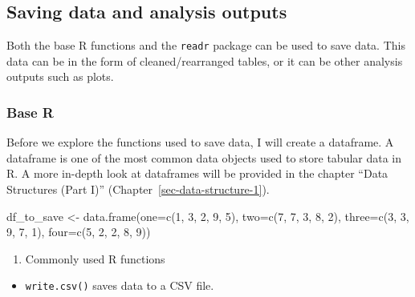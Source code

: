 \documentclass[
  letterpaper,
  DIV=11,
  numbers=noendperiod]{scrreprt}
\newenvironment{Shaded}{}{}
\newcommand{\AttributeTok}[1]{\textcolor[rgb]{0.84,0.23,0.29}{#1}}
\newcommand{\DecValTok}[1]{\textcolor[rgb]{0.00,0.36,0.77}{#1}}
\newcommand{\FunctionTok}[1]{\textcolor[rgb]{0.44,0.26,0.76}{#1}}
\newcommand{\NormalTok}[1]{\textcolor[rgb]{0.14,0.16,0.18}{#1}}
\newcommand{\OtherTok}[1]{\textcolor[rgb]{0.44,0.26,0.76}{#1}}
\providecommand{\tightlist}{%
  \setlength{\itemsep}{0pt}\setlength{\parskip}{0pt}}\usepackage{longtable,booktabs,array}
\begin{document}
\subsection{Saving data and analysis
outputs}\label{saving-data-and-analysis-outputs}

Both the base R functions and the \texttt{readr} package can be used to
save data. This data can be in the form of cleaned/rearranged tables, or
it can be other analysis outputs such as plots.

\subsubsection{Base R}\label{base-r-1}

Before we explore the functions used to save data, I will create a
dataframe. A dataframe is one of the most common data objects used to
store tabular data in R. A more in-depth look at dataframes will be
provided in the chapter ``Data Structures (Part I)''
(Chapter~\ref{sec-data-structure-1}).

\begin{Shaded}
\begin{Highlighting}[]
\NormalTok{df\_to\_save }\OtherTok{\textless{}{-}} \FunctionTok{data.frame}\NormalTok{(}\AttributeTok{one=}\FunctionTok{c}\NormalTok{(}\DecValTok{1}\NormalTok{, }\DecValTok{3}\NormalTok{, }\DecValTok{2}\NormalTok{, }\DecValTok{9}\NormalTok{, }\DecValTok{5}\NormalTok{),}
                         \AttributeTok{two=}\FunctionTok{c}\NormalTok{(}\DecValTok{7}\NormalTok{, }\DecValTok{7}\NormalTok{, }\DecValTok{3}\NormalTok{, }\DecValTok{8}\NormalTok{, }\DecValTok{2}\NormalTok{),}
                         \AttributeTok{three=}\FunctionTok{c}\NormalTok{(}\DecValTok{3}\NormalTok{, }\DecValTok{3}\NormalTok{, }\DecValTok{9}\NormalTok{, }\DecValTok{7}\NormalTok{, }\DecValTok{1}\NormalTok{),}
                         \AttributeTok{four=}\FunctionTok{c}\NormalTok{(}\DecValTok{5}\NormalTok{, }\DecValTok{2}\NormalTok{, }\DecValTok{2}\NormalTok{, }\DecValTok{8}\NormalTok{, }\DecValTok{9}\NormalTok{))}
\end{Highlighting}
\end{Shaded}

\begin{enumerate}
\def\labelenumi{\arabic{enumi}.}
\tightlist
\item
  Commonly used R functions
\end{enumerate}

\begin{itemize}
\tightlist
\item
  \texttt{write.csv()} saves data to a CSV file.
\end{itemize}
\end{document}
